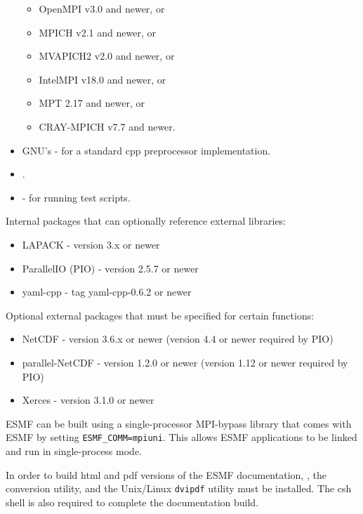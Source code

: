 \begin{itemize}
  \begin{itemize}
  \item OpenMPI v3.0 and newer, or
  \item MPICH v2.1 and newer, or
  \item MVAPICH2 v2.0 and newer, or
  \item IntelMPI v18.0 and newer, or
  \item MPT 2.17 and newer, or
  \item CRAY-MPICH v7.7 and newer.
  \end{itemize}
\item GNU's  -
for a standard cpp preprocessor implementation.
\item {}.
\item {} - for running
test scripts.
\end{itemize}

Internal packages that can optionally reference external libraries:
\begin{itemize}
\item LAPACK - version 3.x or newer
\item ParallelIO (PIO) - version 2.5.7 or newer
\item yaml-cpp - tag yaml-cpp-0.6.2 or newer
\end{itemize}

Optional external packages that must be specified for certain functions:
\begin{itemize}
\item NetCDF - version 3.6.x or newer (version 4.4 or newer required by PIO)
\item parallel-NetCDF - version 1.2.0 or newer (version 1.12 or newer required by PIO)
\item Xerces - version 3.1.0 or newer
\end{itemize}

ESMF can be built using a single-processor MPI-bypass library
that comes with ESMF by setting {\tt ESMF\_COMM=mpiuni}. This allows ESMF applications
to be linked and run in single-process mode.

In order to build html and pdf versions of the ESMF documentation, 
,
the 
conversion utility, and the Unix/Linux {\tt dvipdf} utility must be installed.
The csh shell is also required to complete the documentation build.
